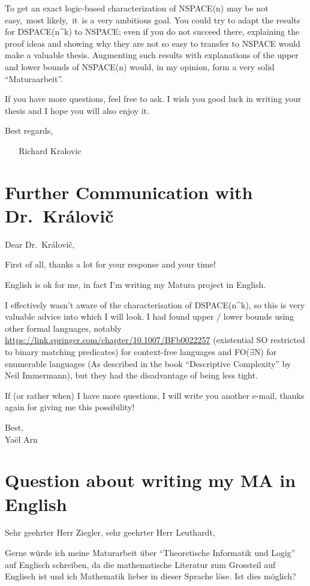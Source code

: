 To get an exact logic-based characterization of NSPACE(n) may be not
easy,~most likely,~it~is a very ambitious goal. You could try to adapt
the results for DSPACE(n\^{}k) to NSPACE; even if you do not succeed
there, explaining the proof ideas and showing why they are not so easy
to transfer to NSPACE would make a valuable thesis. Augmenting such
results with explanations of the upper and lower bounds of NSPACE(n)
would, in my opinion, form a very solid ``Maturaarbeit''.

If you have more questions, feel free to ask. I wish you good luck in
writing your thesis and I hope you will also enjoy it.

Best regards,

~ ~ Richard Kralovic

\section{Further Communication with
Dr.~Královi\v{c}}\label{further-communication-with-dr.-kruxe1loviux10d}

Dear Dr.~Královi\v{c},

First of all, thanks a lot for your response and your time!

English is ok for me, in fact I'm writing my Matura project in English.

I effectively wasn't aware of the characterisation of DSPACE(n\^{}k), so
this is very valuable advice into which I will look. I had found upper /
lower bounds using other formal languages, notably
\url{https://link.springer.com/chapter/10.1007/BFb0022257} (existential
SO restricted to binary matching predicates) for context-free languages
and FO($\exists$N) for enumerable languages (As described in the book
``Descriptive Complexity'' by Neil Immermann), but they had the
disadvantage of being less tight.

If (or rather when) I have more questions, I will write you another
e-mail, thanks again for giving me this possibility!

Best,\\
Yaël Arn

\section{Question about writing my MA in
English}\label{question-for-writing-ma-in-english}


Sehr geehrter Herr Ziegler, sehr geehrter Herr Leuthardt,

\sloppy Gerne würde ich meine Maturarbeit über ``Theoretische Informatik und
Logig'' auf Englisch schreiben, da die mathematische Literatur zum
Grossteil auf Englisch ist und ich Mathematik lieber in dieser Sprache
löse. Ist dies möglich?

